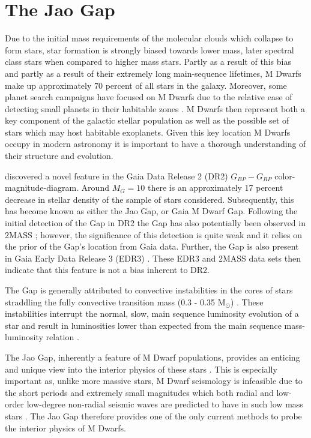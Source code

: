 \section{The Jao Gap}\label{sec:intro}
Due to the initial mass requirements of the molecular clouds which collapse to form
stars, star formation is strongly biased towards lower mass, later spectral
class stars when compared to higher mass stars. Partly as a result of this
bias and partly as a result of their extremely long main-sequence lifetimes,
M Dwarfs make up approximately 70 percent of all stars in the galaxy. Moreover,
some planet search campaigns have focused on M Dwarfs due to the relative ease
of detecting small planets in their habitable zones \citep[e.g.][]{Nut08}.
M Dwarfs then represent both a key component of the galactic stellar population
as well as the possible set of stars which may host habitable exoplanets.
Given this key location M Dwarfs occupy in modern astronomy it is important to
have a thorough understanding of their structure and evolution.

\citet{Jao2018} discovered a novel feature in the Gaia Data Release 2 (DR2)
$G_{BP}-G_{RP}$ color-magnitude-diagram. Around $M_{G}=10$ there is an
approximately 17 percent decrease in stellar density of the sample of stars
\citet{Jao2018} considered. Subsequently, this has become known as either the
Jao Gap, or Gaia M Dwarf Gap. Following the initial detection of the Gap in DR2
the Gap has also potentially been observed in 2MASS \citep{Skrutskie2006,
Jao2018}; however, the significance of this detection is quite weak and it
relies on the prior of the Gap's location from Gaia data. Further, the Gap is
also present in Gaia Early Data Release 3 (EDR3) \citep{Jao2021}. These EDR3
and 2MASS data sets then indicate that this feature is not a bias inherent to
DR2.

The Gap is generally attributed to convective instabilities in the cores of
stars straddling the fully convective transition mass (0.3 - 0.35 M$_{\odot}$)
\citep{Baraffe2018}. These instabilities interrupt the normal, slow, main
sequence luminosity evolution of a star and result in luminosities lower
than expected from the main sequence mass-luminosity relation \citep{Jao2020}.

The Jao Gap, inherently a feature of M Dwarf populations, provides an enticing
and unique view into the interior physics of these stars \citep{Feiden2021}.
This is especially important as, unlike more massive stars, M Dwarf seismology
is infeasible due to the short periods and extremely small
magnitudes which both radial and low-order low-degree non-radial seismic waves
are predicted to have in such low mass stars \citep{Rodriguez-Lopez2019}. The
Jao Gap therefore provides one of the only current methods to probe the
interior physics of M Dwarfs.

